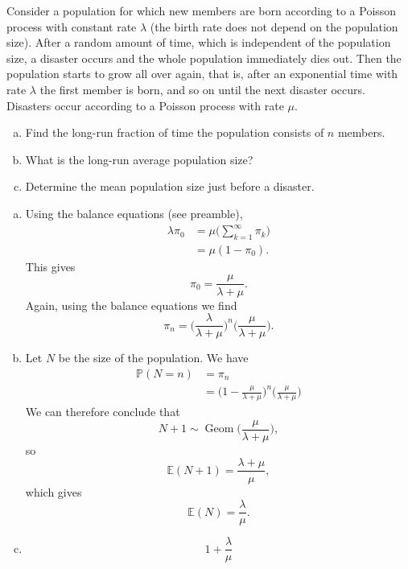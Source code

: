 \begin{problem}{}{}


    Consider a population for which new members are born according to a Poisson process with constant  rate $\lambda$ (the  birth  rate  does  not  depend  on  the  population  size).   After  a  random amount of time, which is independent of the population size, a disaster occurs and the whole population immediately dies out.  Then the population starts to grow all over again, that is, after an exponential time with rate $\lambda$ the first member is born, and so on until the next disaster occurs. Disasters occur according to a Poisson process with rate $\mu$.
    \begin{enumerate}[a)]
        \item Find the long-run fraction of time the population consists of $n$ members.
        \item What is the long-run average population size?
        \item Determine the mean population size just before a disaster.
    \end{enumerate}

    \tcblower

    \begin{enumerate}[a)]
        \item Using the balance equations (see preamble),
            \begin{align*}
                \lambda \pi_0 &= \mu \biggl( \sum_{k = 1}^\infty \pi_k \biggr) \\
                &= \mu (1 - \pi_0) .
            \end{align*}
        This gives
            $$ \pi_0 = \frac{\mu}{\lambda + \mu} . $$
        Again, using the balance equations we find
            $$ \pi_n = \biggl( \frac{\lambda}{\lambda + \mu} \biggr)^n \biggl( \frac{\mu}{\lambda + \mu} \biggr) . $$
        \item Let $N$ be the size of the population. We have
            \begin{align*}
                \mathbb{P}(N = n) &= \pi_n \\
                &= \biggl( 1 - \frac{\mu}{\lambda + \mu} \biggr)^n \biggl( \frac{\mu}{\lambda + \mu} \biggr)
            \end{align*}
            We can therefore conclude that
                $$ N + 1 \sim \operatorname{Geom}\biggl( \frac{\mu}{\lambda + \mu} \biggr) , $$
            so
                $$ \mathbb{E}(N + 1) = \frac{\lambda + \mu}{\mu} , $$
            which gives
                $$ \mathbb{E}(N) = \frac{\lambda}{\mu} . $$
        \item
            $$ 1 + \frac{\lambda}{\mu} $$
    \end{enumerate}

\end{problem}

